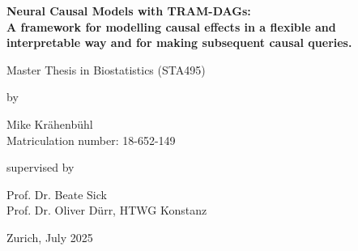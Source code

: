 \renewcommand\familydefault{\sfdefault} 


\thispagestyle{empty}
\renewcommand{\baselinestretch}{1.5}\normalfont
\begin{center}
\setlength{\parindent}{0cm}
\bf\Large%
Neural Causal Models with TRAM-DAGs: \\
A framework for modelling causal effects in a flexible and \\
interpretable way and for making subsequent causal queries.\\
\normalfont



\hrulefill

\vspace*{4cm}

\large
Master Thesis in Biostatistics (STA495) %
\vspace*{12mm}

by

\vspace*{12mm}

Mike Kr{\"a}henb{\"u}hl\\
\small Matriculation number: 18-652-149\\
\normalfont
\vspace*{4cm}

supervised by

\vspace*{1cm}

Prof. Dr. Beate Sick \\
Prof. Dr. Oliver D{\"u}rr, HTWG Konstanz
\vfill

Zurich, July 2025
\end{center}
\renewcommand\familydefault{\rmdefault}%
\renewcommand{\baselinestretch}{1.0}\rm 
\setcounter{page}{0}
\newpage
\vspace*{12cm}~\thispagestyle{empty}
\newpage

